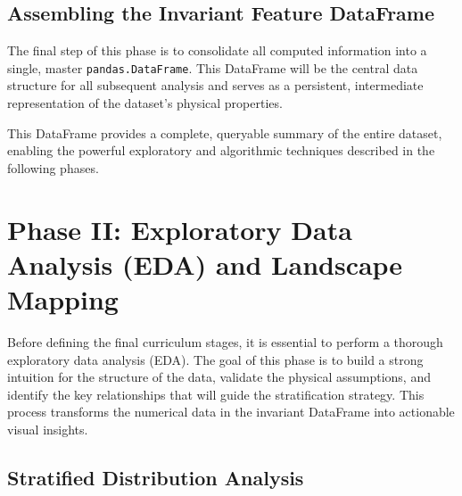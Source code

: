 \subsection{Assembling the Invariant Feature DataFrame}

The final step of this phase is to consolidate all computed information into a single, master \texttt{pandas.DataFrame}. This DataFrame will be the central data structure for all subsequent analysis and serves as a persistent, intermediate representation of the dataset's physical properties.

\begin{table}[H]
\centering
\caption{Recommended structure for the Invariant Feature DataFrame.}
\label{tab:dataframe}
\end{table}

This DataFrame provides a complete, queryable summary of the entire dataset, enabling the powerful exploratory and algorithmic techniques described in the following phases.

\section{Phase II: Exploratory Data Analysis (EDA) and Landscape Mapping}

Before defining the final curriculum stages, it is essential to perform a thorough exploratory data analysis (EDA). The goal of this phase is to build a strong intuition for the structure of the data, validate the physical assumptions, and identify the key relationships that will guide the stratification strategy. This process transforms the numerical data in the invariant DataFrame into actionable visual insights.

\subsection{Stratified Distribution Analysis}

